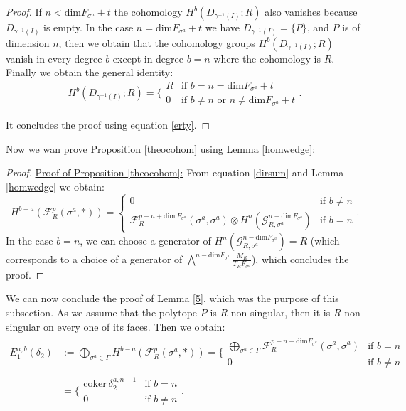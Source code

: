 \documentclass{article}
\begin{document}
\begin{proof}
    If $n<\mathrm{dim}F_{\sigma^a}+t$ the cohomology $H^{b}(D_{\gamma^{-1}(I)};R)$ also vanishes because $D_{\gamma^{-1}(I)}$ is empty. In the case $n=\mathrm{dim}F_{\sigma^a}+t$ we have $D_{\gamma^{-1}(I)}=\{P\}$, and $P$ is of dimension $n$, then we obtain that the cohomology groups $H^{b}(D_{\gamma^{-1}(I)};R)$ vanish in every degree $b$ except in degree $b=n$ where the cohomology is $R$. Finally we obtain the general identity:
    \begin{equation*}
        H^{b}(D_{\gamma^{-1}(I)};R)=\Bigg\{\begin{array}{ll}
            R & \text{if } b=n=\mathrm{dim}F_{\sigma^a}+t \\
            0 & \text{if } b\neq n \text{ or }n\neq \mathrm{dim}F_{\sigma^a}+t
        \end{array}.
    \end{equation*}

    It concludes the proof using equation \ref{erty}.
\end{proof}

Now we wan prove Proposition \ref{theocohom} using Lemma \ref{homwedge}:

\begin{proof}
    \underline{Proof of Proposition \ref{theocohom}:} From equation \ref{dirsum} and Lemma \ref{homwedge} we obtain:
    \begin{equation*}
        H^{b-a}(\mathcal{F}_R^p(\sigma^a,*)) = \left \{ \begin{array}{ll}
            0 & \text{if } b\neq n \\
            \mathcal{F}_R^{p - n + \mathrm{dim} ~ F_{\sigma^a}}(\sigma^a,\sigma^a)\otimes H^n(\mathcal{G}^{n-\mathrm{dim}F_{\sigma^a}}_{R,\sigma^a}) & \text{if } b=n
        \end{array} \right . .
    \end{equation*}
    In the case $b=n$, we can choose a generator of $H^n(\mathcal{G}^{n-\mathrm{dim}F_{\sigma^a}}_{R,\sigma^a})=R$ (which corresponds to a choice of a generator of $\bigwedge^{n-\mathrm{dim}F_{\sigma^a}}\frac{M_R}{T_RF_{\sigma^a}}$), which concludes the proof.
\end{proof}


We can now conclude the proof of Lemma \ref{5}, which was the purpose of this subsection. As we assume that the polytope $P$ is $R$-non-singular, then it is $R$-non-singular on every one of its faces. Then we obtain:
\begin{align*}
    E_1^{a,b}(\delta_{2})&:= \bigoplus_{\sigma^a \in \Gamma} H^{b-a}(\mathcal{F}^p_R(\sigma^a,*)) = \Bigg\{ \begin{array}{ll}
         \bigoplus_{\sigma^a \in \Gamma}\mathcal{F}^{p-n+\mathrm{dim}F_{\sigma^a}}_R(\sigma^a,\sigma^a)& \text{if } b = n \\
         0 & \text{if } b \neq n 
    \end{array} \\
    &= \Bigg\{ \begin{array}{ll}
         \mathrm{coker} ~ \delta^{a,n-1}_{2}& \text{if } b = n \\
         0 & \text{if } b \neq n 
         \end{array} .
\end{align*}
\end{document}

